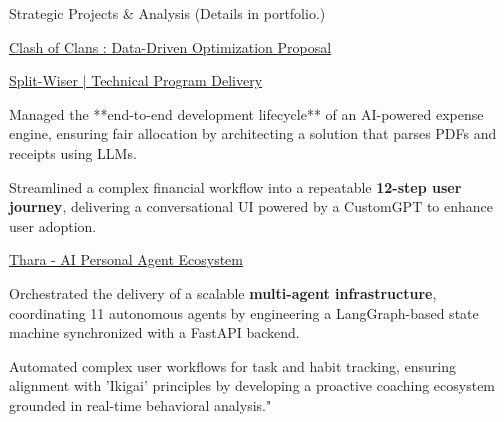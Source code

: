 \documentclass{resume} %
\begin{document}
\begin{rSection}{Strategic Projects \& Analysis {\fontsize{8}{9}\selectfont (Details in portfolio.)}\vspace{.2em}}
\begin{rSubsection}{\href{https://www.abhishekn.in/clashofclans}{Clash of Clans : Data-Driven Optimization Proposal}}{}{}{}
\end{rSubsection}
\begin{rSubsection}{\href{https://www.abhishekn.in/splitwiser}{Split-Wiser | Technical Program Delivery}}{}{}{}
\item[]
\begin{itemize}[left=-1.5em, labelsep=.1cm, labelwidth=.2cm, itemsep=0.0em]
{\item Managed the **end-to-end development lifecycle** of an AI-powered expense engine, ensuring fair allocation by architecting a solution that parses PDFs and receipts using LLMs.}
{\item Streamlined a complex financial workflow into a repeatable \textbf{12-step user journey}, delivering a conversational UI powered by a CustomGPT to enhance user adoption.}
\end{itemize}
\end{rSubsection}
\begin{rSubsection}{\href{https://withthara.com/}{Thara - AI Personal Agent Ecosystem}}{}{}{}
\item[]
\begin{itemize}[left=-1.5em, labelsep=.1cm, labelwidth=.2cm, itemsep=0.0em]
{\item Orchestrated the delivery of a scalable \textbf{multi-agent infrastructure}, coordinating 11 autonomous agents by engineering a LangGraph-based state machine synchronized with a FastAPI backend.}
{\item Automated complex user workflows for task and habit tracking, ensuring alignment with 'Ikigai' principles by developing a proactive coaching ecosystem grounded in real-time behavioral analysis."}
\end{itemize}
\end{rSubsection}

\vspace{0.25 em}
\end{rSection}
\end{document}
